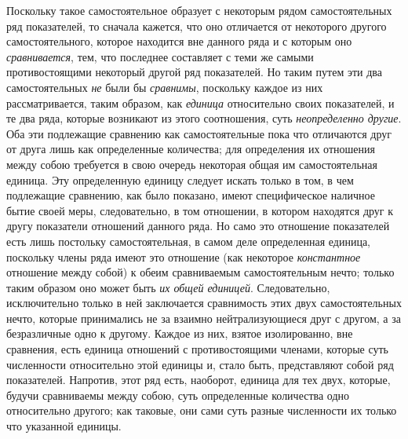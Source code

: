 Поскольку такое самостоятельное образует с некоторым рядом самостоятельных
ряд показателей, то сначала кажется, что оно отличается от некоторого
другого самостоятельного, которое находится вне данного ряда и с которым
оно {\em сравнивается}, тем, что последнее составляет с
теми же самыми противостоящими некоторый другой ряд показателей. Но таким
путем эти два самостоятельных {\em не} были бы
{\em сравнимы}, поскольку каждое из них
рассматривается, таким образом, как {\em единица}
относительно своих показателей, и те два ряда, которые возникают из этого
соотношения, суть {\em неопределенно другие}. Оба эти
подлежащие сравнению как самостоятельные пока что отличаются друг от друга
лишь как определенные количества; для определения их отношения между собою
требуется в свою очередь некоторая общая им самостоятельная единица. Эту
определенную единицу следует искать только в том, в чем подлежащие
сравнению, как было показано, имеют специфическое наличное бытие своей
меры, следовательно, в том отношении, в котором находятся друг к другу
показатели отношений данного ряда. Но само это отношение показателей есть
лишь постольку самостоятельная, в самом деле определенная единица,
поскольку члены ряда имеют это отношение (как некоторое
{\em константное} отношение между собой) к обеим
сравниваемым самостоятельным нечто; только таким образом оно может быть
{\em их общей единицей}. Следовательно, исключительно
только в ней заключается сравнимость этих двух самостоятельных нечто,
которые принимались не за взаимно нейтрализующиеся друг с другом, а за
безразличные одно к другому. Каждое из них, взятое изолированно, вне
сравнения, есть единица отношений с противостоящими членами, которые суть
численности относительно этой единицы и, стало быть, представляют собой ряд
показателей. Напротив, этот ряд есть, наоборот, единица для тех двух,
которые, будучи сравниваемы между собою, суть определенные количества одно
относительно другого; как таковые, они сами суть разные численности их
только что указанной единицы.


